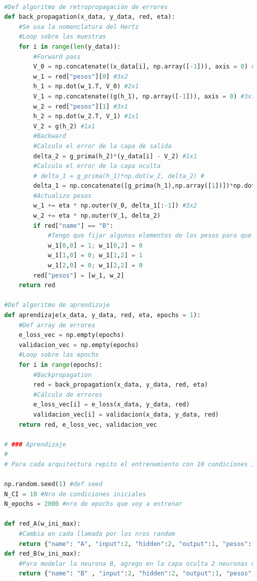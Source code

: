 \documentclass[aps,prb,twocolumn,superscriptaddress,floatfix,longbibliography]{revtex4-2}
\newcounter{para}
\begin{document}
\begin{lstlisting}[language=Python]
  
  #Def algoritmo de retropropagación de errores
  def back_propagation(x_data, y_data, red, eta):
      #Se usa la nomenclatura del Hertz
      #Loop sobre las muestras
      for i in range(len(y_data)):   
          #Forward pass
          V_0 = np.concatenate((x_data[i], np.array([-1])), axis = 0) #Agrego el bias 3x1
          w_1 = red["pesos"][0] #3x2
          h_1 = np.dot(w_1.T, V_0) #2x1
          V_1 = np.concatenate((g(h_1), np.array([-1])), axis = 0) #3x1
          w_2 = red["pesos"][1] #3x1
          h_2 = np.dot(w_2.T, V_1) #1x1
          V_2 = g(h_2) #1x1
          #Backward
          #Calculo el error de la capa de salida
          delta_2 = g_prima(h_2)*(y_data[i] - V_2) #1x1
          #Calculo el error de la capa oculta
          # delta_1 = g_prima(h_1)*np.dot(w_2, delta_2) #
          delta_1 = np.concatenate([g_prima(h_1),np.array([1])])*np.dot(w_2, delta_2) #3x1
          #Actualizo pesos
          w_1 += eta * np.outer(V_0, delta_1[:-1]) #3x2
          w_2 += eta * np.outer(V_1, delta_2)
          if red["name"] == "B":
              #Tengo que fijar algunos elementos de los pesos para que no varíen
              w_1[0,0] = 1; w_1[0,2] = 0
              w_1[1,0] = 0; w_1[1,2] = 1
              w_1[2,0] = 0; w_1[2,2] = 0
          red["pesos"] = [w_1, w_2]
      return red
  
  #Def algoritmo de aprendizaje
  def aprendizaje(x_data, y_data, red, eta, epochs = 1):
      #Def array de errores
      e_loss_vec = np.empty(epochs)
      validacion_vec = np.empty(epochs)
      #Loop sobre las epochs
      for i in range(epochs):
          #Backpropagation
          red = back_propagation(x_data, y_data, red, eta)
          #Cálculo de errores
          e_loss_vec[i] = e_loss(x_data, y_data, red)
          validacion_vec[i] = validacion(x_data, y_data, red)
      return red, e_loss_vec, validacion_vec
  
  # ### Aprendizaje
  # 
  # Para cada arquitectura repito el entrenamiento con 10 condiciones iniciales distintas
  
  np.random.seed(1) #def seed
  N_CI = 10 #Nro de condiciones iniciales
  N_epochs = 2000 #nro de epochs que voy a entrenar
  
  def red_A(w_ini_max):
      #Cambia en cada llamada por los nros random
      return {"name": "A", "input":2, "hidden":2, "output":1, "pesos":[np.random.rand(3,2)*w_ini_max, np.random.rand(3,1)*w_ini_max]}
  def red_B(w_ini_max):
      #Para modelar la neurona B, agrego en la capa oculta 2 neuronas que van a ser una copia directa de las neuronas previas correspondientes. Esto tengo que modificarlo a mano luego
      return {"name": "B" , "input":2, "hidden":2, "output":1, "pesos":[np.random.rand(3,3)*w_ini_max, np.random.rand(4,1)*w_ini_max]}
  

\end{lstlisting}
\end{document}
